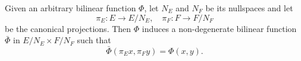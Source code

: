 Given an arbitrary bilinear function $\Phi$, let $N_E$ and $N_F$ be its nullspaces and let
$$\pi_E: E \rightarrow E/N_E, \quad \pi_F: F \rightarrow F/N_F$$
be the canonical projections. Then $\Phi$ induces a non-degenerate bilinear function $\bar{\Phi}$ in $E/N_E \times F/N_F$ such that
$$\bar{\Phi}(\pi_E x, \pi_F y) = \Phi(x, y).$$
